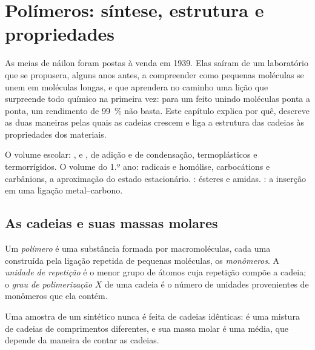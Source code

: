 \chapter{Polímeros: síntese, estrutura e propriedades}\label{ch:b2:polymer-synthesis}

As meias de náilon foram postas à venda em 1939. Elas saíram de um laboratório que se propusera, alguns
anos antes, a compreender como pequenas moléculas se unem em moléculas longas, e que aprendera no
caminho uma lição que surpreende todo químico na primeira vez: para um  feito unindo moléculas
ponta a ponta, um rendimento de 99~\% não basta. Este capítulo explica por quê, descreve as duas
maneiras pelas quais as cadeias crescem e liga a estrutura das cadeias às propriedades dos materiais.

\begin{recall}
O volume escolar: ,  e ,  de adição e de condensação,
termoplásticos e termorrígidos. O volume do 1.º ano: radicais e homólise, carbocátions e carbânions, a
aproximação do estado estacionário. : ésteres e amidas.
: a inserção em uma ligação metal--carbono.
\end{recall}

\section{As cadeias e suas massas molares}

\begin{definition}[Polímero]\label{def:b2:polymer-synthesis:polymer}
Um \emph{polímero} é uma substância formada por macromoléculas, cada uma construída pela
ligação repetida de pequenas moléculas, os \emph{monômeros}. A \emph{unidade de repetição}
é o menor grupo de átomos cuja repetição compõe a cadeia; o \emph{grau de
polimerização} $X$ de uma cadeia é o número de unidades provenientes de monômeros
que ela contém.
\end{definition}

Uma amostra de um  sintético nunca é feita de cadeias idênticas: é uma mistura de cadeias de
comprimentos diferentes, e sua massa molar é uma média, que depende da maneira de contar as cadeias.

